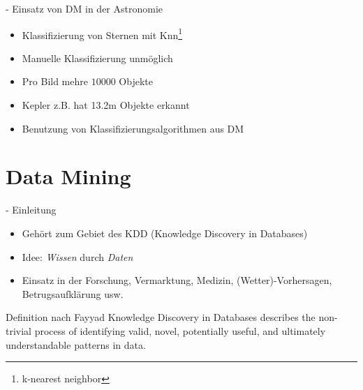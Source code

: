 \documentclass[fleqn,11pt,aspectratio=43]{beamer}
\begin{document}
\begin{frame}{\insertsectionhead - Einsatz von DM in der Astronomie}
\begin{itemize}
\item Klassifizierung von Sternen mit Knn\footnote{k-nearest neighbor}
\item Manuelle Klassifizierung unmöglich \cite{ester2000knowledge}
\item Pro Bild mehre $10000$ Objekte
\item Kepler z.B. hat 13.2m Objekte erkannt
\item Benutzung von Klassifizierungsalgorithmen aus DM
\end{itemize}
\end{frame}

\section{Data Mining~}

\begin{frame}{\insertsectionhead - Einleitung\cite{ester2000knowledge}}
\begin{itemize}
\item Gehört zum Gebiet des KDD (Knowledge Discovery in Databases)
\item Idee: \emph{Wissen} durch \emph{Daten}
\item Einsatz in der Forschung, Vermarktung, Medizin, (Wetter)-Vorhersagen, 
Betrugsaufklärung usw.
\end{itemize}
\begin{block}{Definition nach Fayyad\cite{fayyad1996data}}
Knowledge Discovery in Databases describes the non-trivial process of 
identifying valid, novel, potentially useful, and ultimately understandable 
patterns in data.
\end{block}
\end{frame}
\end{document}
